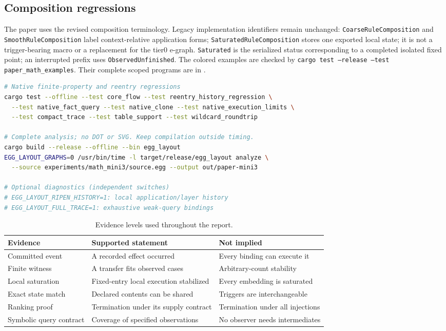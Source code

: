 \documentclass[11pt,a4paper]{article}
\newcommand{\code}[1]{\texttt{#1}}
\begin{document}
\subsection{Composition regressions}

The paper uses the revised composition terminology. Legacy implementation
identifiers remain unchanged: \code{CoarseRuleComposition} and \code{SmoothRuleComposition} label
context-relative application forms; \code{SaturatedRuleComposition} stores one exported local state;
it is not a trigger-bearing macro or a replacement for the tier0 e-graph. \code{Saturated}
is the serialized status corresponding to a completed isolated fixed point; an interrupted prefix uses
\code{ObservedUnfinished}.
The colored examples are checked by \code{cargo test --release --test paper\_math\_examples}.
Their complete scoped programs are in .

\begin{lstlisting}[language=bash]
# Native finite-property and reentry regressions
cargo test --offline --test core_flow --test reentry_history_regression \
  --test native_fact_query --test native_clone --test native_execution_limits \
  --test compact_trace --test table_support --test wildcard_roundtrip

# Complete analysis; no DOT or SVG. Keep compilation outside timing.
cargo build --release --offline --bin egg_layout
EGG_LAYOUT_GRAPHS=0 /usr/bin/time -l target/release/egg_layout analyze \
  --source experiments/math_mini3/source.egg --output out/paper-mini3

# Optional diagnostics (independent switches)
# EGG_LAYOUT_RIPEN_HISTORY=1: local application/layer history
# EGG_LAYOUT_FULL_TRACE=1: exhaustive weak-query bindings
\end{lstlisting}

\begin{table}[!htbp]
\centering\footnotesize
\begin{tabularx}{\linewidth}{@{}p{.22\linewidth}XX@{}}
\toprule
Evidence & Supported statement & Not implied\\
\midrule
Committed event & A recorded effect occurred & Every binding can execute it\\
Finite witness & A transfer fits observed cases & Arbitrary-count stability\\
Local saturation & Fixed-entry local execution stabilized & Every embedding is saturated\\
Exact state match & Declared contents can be shared & Triggers are interchangeable\\
Ranking proof & Termination under its supply contract & Termination under all injections\\
Symbolic query contract & Coverage of specified observations & No observer needs intermediates\\
\bottomrule
\end{tabularx}
\caption{Evidence levels used throughout the report.}
\end{table}
\end{document}
